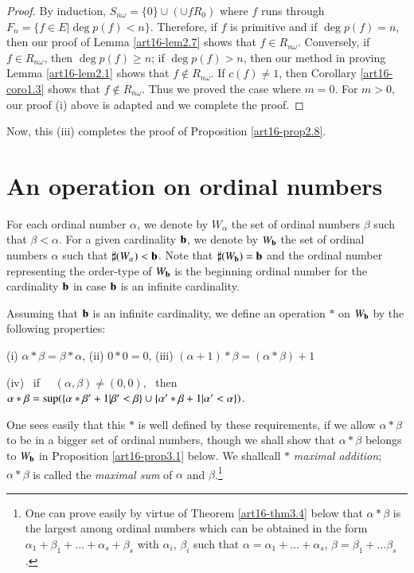 \begin{proof}
By induction, $S_{n\omega} =\{0\} \cup (\cup fR_0)$ where $f$ runs through $F_n = \{f \in E |\deg p(f) < n\}$. Therefore, if $f$ is primitive and if $\deg p(f) = n$, then our proof of Lemma \ref{art16-lem2.7} shows that $f \in R_{n \omega}$. Conversely, if $f \in R_{n\omega}$, then $\deg p(f) \geqslant n$; if $\deg p(f) >n$, then our method in proving Lemma \ref{art16-lem2.1} shows that $f\not\in R_{n\omega}$. If $c (f) \neq 1$, then Corollary \ref{art16-coro1.3} shows that $f \not\in R_{n\omega}$. Thus we proved the case where $m=0$. For $m>0$, our proof (i) above is adapted and we complete the proof. 
\end{proof}

Now, this (iii) completes the proof of Proposition \ref{art16-prop2.8}.

\section{An operation on ordinal numbers}\label{art16-sec3}
For each ordinal number $\alpha$, we denote by $W_\alpha$ the set of ordinal numbers $\beta$ such that $\beta<\alpha$. For a given cardinality $\mathbf{b}$, we denote by $W_{\mathbf{b}}$ the set of ordinal numbers $\alpha$ such that $\sharp (W_\alpha) < \mathbf{b}$. Note that $\sharp (W_{\mathbf{b}}) = \mathbf{b}$ and the ordinal number representing the order-type of $W_{\mathbf{b}}$ is the beginning ordinal number for the cardinality $\mathbf{b}$ in case $\mathbf{b}$ is an infinite cardinality. 

Assuming that $\mathbf{b}$ is an infinite cardinality, we define an operation $*$ on $W_{\mathbf{b}}$ by the following properties:

(i)  \quad $\alpha * \beta = \beta * \alpha$, \quad (ii) \quad $0 * 0 = 0$, \quad (iii) \quad $(\alpha + 1) * \beta = (\alpha * \beta) + 1$

(iv) ~if~~ $(\alpha,\beta) \neq (0,0)$, ~then~ $\alpha * \beta =\sup (\{\alpha * \beta' + 1 | \beta'< \beta\} \break  \cup \{ \alpha' * \beta + 1 | \alpha' < \alpha\})$. 

One sees easily that this $*$ is well defined by these requirements, if we allow $\alpha * \beta$ to be in a bigger set of ordinal numbers, though we shall show that $\alpha * \beta$ belongs to $W_{\mathbf{b}}$ in Proposition \ref{art16-prop3.1} below. We shall\pageoriginale call $*$  {\em maximal addition}; $\alpha *\beta$ is called the {\em maximal sum} of $\alpha$ and $\beta$.\footnote{One can prove easily by virtue of Theorem \ref{art16-thm3.4} below that $\alpha *\beta$ is the largest among ordinal numbers which can be obtained in the form $\alpha_1 + \beta_1 + \ldots + \alpha_s + \beta_s$ with $\alpha_i$, $\beta_i$ such that $\alpha = \alpha_1 + \ldots + \alpha_s$, $\beta = \beta_1+ \ldots \beta_s$.}

